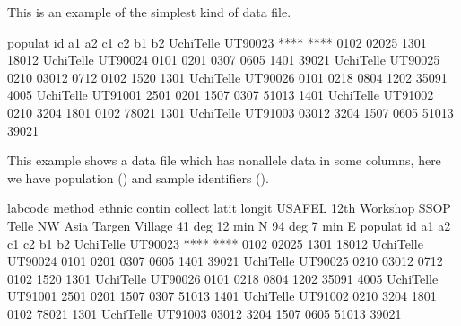 \documentclass[letterpaper,10pt,english,openany,oneside]{sphinxmanual}
\begin{document}
\sphinxAtStartPar
This is an example of the simplest kind of data file.
\def\sphinxLiteralBlockLabel{\label{\detokenize{docs/guide-chapter-usage:data-minimal-noheader}}}
\begin{sphinxVerbatim}[commandchars=\\\{\}]
populat    id        a\PYGZus{}1   a\PYGZus{}2   c\PYGZus{}1   c\PYGZus{}2   b\PYGZus{}1   b\PYGZus{}2
UchiTelle  UT900\PYGZhy{}23  ****  ****  0102  02025 1301  18012
UchiTelle  UT900\PYGZhy{}24  0101  0201  0307  0605  1401  39021
UchiTelle  UT900\PYGZhy{}25  0210  03012 0712  0102  1520  1301
UchiTelle  UT900\PYGZhy{}26  0101  0218  0804  1202  35091 4005
UchiTelle  UT910\PYGZhy{}01  2501  0201  1507  0307  51013 1401
UchiTelle  UT910\PYGZhy{}02  0210  3204  1801  0102  78021 1301
UchiTelle  UT910\PYGZhy{}03  03012 3204  1507  0605  51013 39021
\end{sphinxVerbatim}

\sphinxAtStartPar
This example shows a data file which has non\sphinxhyphen{}allele data in some
columns, here we have population () and sample identifiers
().
\def\sphinxLiteralBlockLabel{\label{\detokenize{docs/guide-chapter-usage:data-hla}}}
\begin{sphinxVerbatim}[commandchars=\\\{\}]
labcode method              ethnic  contin  collect        latit           longit
USAFEL  12th Workshop SSOP  Telle   NW Asia Targen Village 41 deg 12 min N 94 deg 7 min E
populat     id         a\PYGZus{}1     a\PYGZus{}2     c\PYGZus{}1     c\PYGZus{}2     b\PYGZus{}1     b\PYGZus{}2
UchiTelle   UT900\PYGZhy{}23   ****    ****    0102    02025   1301    18012
UchiTelle   UT900\PYGZhy{}24   0101    0201    0307    0605    1401    39021
UchiTelle   UT900\PYGZhy{}25   0210    03012   0712    0102    1520    1301
UchiTelle   UT900\PYGZhy{}26   0101    0218    0804    1202    35091   4005
UchiTelle   UT910\PYGZhy{}01   2501    0201    1507    0307    51013   1401
UchiTelle   UT910\PYGZhy{}02   0210    3204    1801    0102    78021   1301
UchiTelle   UT910\PYGZhy{}03   03012   3204    1507    0605    51013   39021
\end{sphinxVerbatim}
\end{document}
